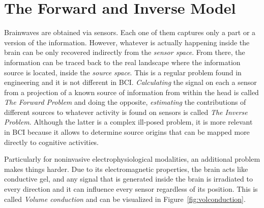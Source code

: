 \section{The Forward and Inverse Model}

Brainwaves are obtained via sensors. Each one of them captures only a part or a version of the information.  However, whatever is actually happening inside the brain can be only recovered indirectly from the \textit{sensor space}. From there, the information can be traced back to the real landscape where the information source is located, inside the \textit{source space}.  This is a regular problem found in engineering and it is not different in BCI.  \textit{Calculating} the signal on each a sensor from a projection of a known source of information from within the head is called \textit{The Forward Problem}\cite{Parra2008,WolpawJonathanR2012}  and doing the opposite, \textit{estimating} the contributions of different sources to whatever activity is found on sensors is called  \textit{The Inverse Problem}.  Although the latter is a complex ill-posed problem, it is more relevant in BCI because it allows to determine source origins that can be mapped more directly to cognitive activities. 

Particularly for noninvasive electrophysiological modalities, an additional problem makes things harder.  Due to its electromagnetic properties, the brain acts like conductive gel, and any signal that is generated inside the brain is irradiated to every direction and it can influence every sensor regardless of its position.  This is called \textit{Volume conduction} \cite{Nam2018,Buzsaki2012} and can be visualized in Figure~\ref{fig:volconduction}.

